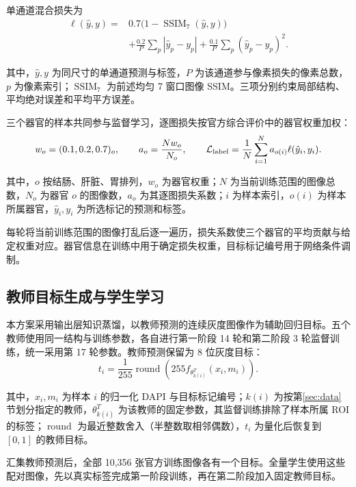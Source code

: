 \documentclass[UTF8,a4paper,zihao=5,fontset=fandol]{ctexart}
\newcommand{\op}[1]{\operatorname{#1}}
\newcommand{\sym}[1]{\par\nobreak\noindent\begin{minipage}{\linewidth}#1\end{minipage}\par}
\begin{document}
单通道混合损失为
\begin{equation}
\begin{aligned}
\ell(\hat y,y)={}&0.7\bigl(1-\op{SSIM}_7(\hat y,y)\bigr)\\
&+\frac{0.2}{P}\sum_p|\hat y_p-y_p|
+\frac{0.1}{P}\sum_p(\hat y_p-y_p)^2.
\end{aligned}
\label{eq:loss}
\end{equation}
\sym{其中，$\hat y,y$ 为同尺寸的单通道预测与标签，$P$ 为该通道参与像素损失的像素总数，$p$ 为像素索引；$\op{SSIM}_7$ 为前述均匀 7 窗口图像 SSIM。三项分别约束局部结构、平均绝对误差和平均平方误差。}


三个器官的样本共同参与监督学习，逐图损失按官方综合评价中的器官权重加权：
\begin{equation}
w_o=(0.1,0.2,0.7)_o,\qquad a_o=\frac{Nw_o}{N_o},\qquad
\mathcal L_{\rm label}=\frac1N\sum_{i=1}^{N}a_{o(i)}\ell(\hat y_i,y_i).
\label{eq:organloss}
\end{equation}
\sym{其中，$o$ 按结肠、肝脏、胃排列，$w_o$ 为器官权重；$N$ 为当前训练范围的图像总数，$N_o$ 为器官 $o$ 的图像数，$a_o$ 为其逐图损失系数；$i$ 为样本索引，$o(i)$ 为样本所属器官，$\hat y_i,y_i$ 为所选标记的预测和标签。}
每轮将当前训练范围的图像打乱后逐一遍历，损失系数使三个器官的平均贡献与给定权重对应。器官信息在训练中用于确定损失权重，目标标记编号用于网络条件调制。

\subsection{教师目标生成与学生学习}
本方案采用输出层知识蒸馏\cite{distill}，以教师预测的连续灰度图像作为辅助回归目标。五个教师使用同一结构与训练参数，各自进行第一阶段 14 轮和第二阶段 3 轮监督训练，统一采用第 17 轮参数。教师预测保留为 8 位灰度目标：
\begin{equation}
t_i=\frac1{255}\op{round}\!\left(255 f_{\theta^{T}_{k(i)}}(x_i,m_i)\right).
\label{eq:target}
\end{equation}
\sym{其中，$x_i,m_i$ 为样本 $i$ 的归一化 DAPI 与目标标记编号；$k(i)$ 为按第\ref{sec:data}节划分指定的教师，$\theta^{T}_{k(i)}$ 为该教师的固定参数，其监督训练排除了样本所属 ROI 的标签；$\op{round}$ 为最近整数舍入（半整数取相邻偶数），$t_i$ 为量化后恢复到 $[0,1]$ 的教师目标。}
汇集教师预测后，全部 10,356 张官方训练图像各有一个目标。全量学生使用这些配对图像，先以真实标签完成第一阶段训练，再在第二阶段加入固定教师目标。
\end{document}
